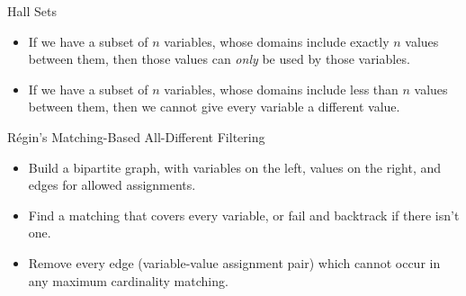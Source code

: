\documentclass{beamer}
\begin{document}
\begin{frame}{Hall Sets}
    \begin{itemize}
        \item If we have a subset of $n$ variables, whose domains include exactly $n$ values between
            them, then those values can \emph{only} be used by those variables.

        \item If we have a subset of $n$ variables, whose domains include less than $n$ values
            between them, then we cannot give every variable a different value.
    \end{itemize}
\end{frame}


\begin{frame}{R\'egin's Matching-Based All-Different Filtering}
    \begin{itemize}
        \item Build a bipartite graph, with variables on the left, values on
            the right, and edges for allowed assignments.

        \item Find a matching that covers every variable, or fail and backtrack if there isn't
            one.

        \item Remove every edge (variable-value assignment pair) which cannot occur in any
            maximum cardinality matching.
    \end{itemize}
\end{frame}
\end{document}
